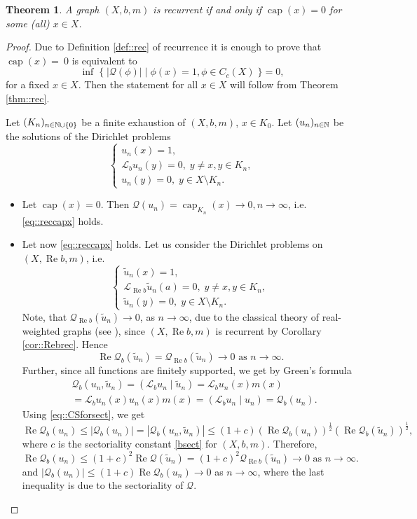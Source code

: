 \documentclass[a4paper,11pt]{amsart}
\newtheorem{theorem}{Theorem}[section]
\theoremstyle{definition}
\renewcommand{\Re}{\operatorname{Re}}%
\newcommand{\cp}{\operatorname{cap}}
\renewcommand{\L}{\mathcal{L}}
\newcommand{\Q}{\mathcal{Q}}
\begin{document}
\begin{theorem}\label{thm::reccap}
A graph $(X,b,m)$ is recurrent if and only if $\cp(x)= 0$ for some (all) $x\in X$.
\end{theorem}

\begin{proof}
Due to Definition \ref{def::rec} of recurrence it is enough to prove that $\cp(x)=~0$ is equivalent to
\begin{equation}\label{eq::reccapx}
\inf \;\{\;|\Q(\phi)|\;|\;\phi(x)=1, \phi\in C_c(X)\;\}=0,
\end{equation}
for a fixed $x\in X$. Then the statement for all $x\in X$ will follow from Theorem \ref{thm::rec}.

 Let $(K_n)_{n\in \Bbb N\cup \{0\}}$ be a finite exhaustion of $(X,b,m)$, $x\in K_0$.
Let $(u_n)_{n\in \Bbb N}$ be the solutions of the Dirichlet problems
\begin{equation*}
\begin{cases}
u_n(x)=1,\\
\L_b u_n(y)=0,\; y\ne x, y\in K_n,\\
u_n(y)=0,\; y\in X\setminus K_n.
\end{cases}
\end{equation*}
\begin{itemize}[leftmargin=*]
\item
Let $\cp(x)= 0$. Then $\Q(u_n)=\cp_{K_n}(x)\to 0, n\to \infty$, i.e. \eqref{eq::reccapx} holds.
\item
Let now \eqref {eq::reccapx} holds. Let us consider the Dirichlet problems on $(X,\Re b,m)$, i.e. 
\begin{equation*}
\begin{cases}
\widetilde u_n(x)=1,\\
\L_{\Re b} \widetilde u_n(a)=0,\; y\ne x, y\in K_n,\\
\widetilde u_n(y)=0,\; y\in X\setminus K_n.
\end{cases}
\end{equation*}
Note, that $ \Q_{\Re b}(\widetilde u_n)\to 0$, as $n\to \infty$, due to the classical theory of real-weighted graphs (see \cite[Theorem 6.1(xi.b)]{KellerLenzWojcBook}), since $(X, \Re b, m)$ is recurrent by  Corollary \ref{cor::Rebrec}. Hence 
$$\Re  \Q_b(\widetilde u_n) =  \Q_{\Re b}(\widetilde u_n)\to 0\mbox{ as }n\to\infty.
$$
 Further, since all functions are finitely supported, we get by Green's formula 
\begin{align*}
 &\Q_b(u_n, \widetilde u_n)=(\L_b u_n\;|\; \widetilde u_n )=\L_b u_n(x)m(x)\\
 &=\L_b u_n(x)u_n(x)m(x)=(\L_b u_n\;|\; u_n )=\Q_b(u_n).
\end{align*}
Using \eqref{eq::CSforsect}, we get
$$
\Re  \Q_b(u_n)\le | \Q_b(u_n)|= | \Q_b(u_n, \widetilde u_n)| \le(1+c)(\Re  \Q_b(u_n))^\frac 12 (\Re  \Q_b(\widetilde u_n))^\frac 12,
$$
where $c$ is the sectoriality constant \eqref{bsect} for $(X,b,m)$.
Therefore, 
$$
\Re  \Q_b(u_n)\le(1+c)^2 \Re  \Q(\widetilde u_n)=(1+c)^2  \Q_{\Re b}(\widetilde u_n)\to 0\mbox{ as }n\to\infty.
$$
and $| \Q_b(u_n)|\le (1+c)\Re  \Q_b(u_n) \to 0$ as $ n\to \infty$, where the last inequality is due to the sectoriality of $\Q$.
\end{itemize}
\end{proof}
\end{document}
